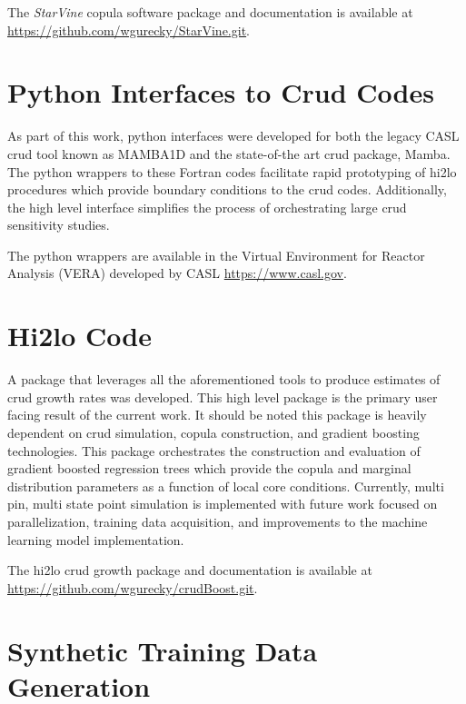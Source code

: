 The \emph{StarVine} copula software package and documentation is available at \url{https://github.com/wgurecky/StarVine.git}.

\section{Python Interfaces to Crud Codes}

As part of this work, python interfaces were developed for both the legacy CASL crud tool known as MAMBA1D and the state-of-the art crud package, Mamba.  The python wrappers to these Fortran codes facilitate rapid prototyping of hi2lo procedures which provide boundary conditions to the crud codes.  Additionally, the high level interface simplifies the process of orchestrating large crud sensitivity studies.

The python wrappers are available in the Virtual Environment for Reactor Analysis (VERA) developed by CASL \url{https://www.casl.gov}.

\section{Hi2lo Code}

A package that leverages all the aforementioned tools to produce estimates of crud growth rates was developed.  This high level package is the primary user facing result of the current work.  It should be noted this package is heavily dependent on crud simulation, copula construction, and gradient boosting technologies.
This package orchestrates the construction and evaluation of gradient boosted regression trees which provide the copula and marginal distribution parameters as a function of local core conditions.
Currently, multi pin, multi state point simulation is implemented with future work focused on parallelization, training data acquisition, and improvements to the machine learning model implementation.

The hi2lo crud growth package and documentation is available at \url{https://github.com/wgurecky/crudBoost.git}.


\section{Synthetic Training Data Generation}
\label{chap:synth}

